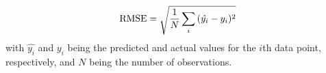 $$\textnormal{RMSE}=\sqrt{\frac{1}{N}\sum\limits_{i}{(\hat{y_i}-y_i)^2}}$$
with $\hat{y_i}$ and $y_i$ being the predicted and actual values for the $i$th data point, respectively, and $N$ being the number of observations.